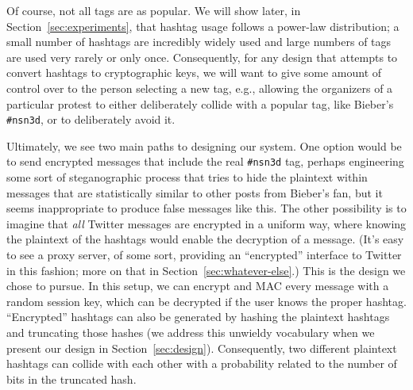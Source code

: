 Of course, not all tags are as popular. We will show later, in Section~\ref{sec:experiments}, that hashtag usage follows a power-law distribution; a small number of hashtags are incredibly widely used and large numbers of tags are used very rarely or only once. Consequently, for any design that attempts to convert hashtags to cryptographic keys, we will want to give some amount of control over to the person selecting a new tag, e.g., allowing the organizers of a particular protest to either deliberately collide with a popular tag, like Bieber's {\tt \#nsn3d}, or to deliberately avoid it.

Ultimately, we see two main paths to designing our system. One option would be to send encrypted messages that include the real {\tt \#nsn3d} tag, perhaps engineering some sort of steganographic process that tries to hide the plaintext within messages that are statistically similar to other posts from Bieber's fan, but it seems inappropriate to produce false messages like this. The other possibility is to imagine that {\em all} Twitter messages are encrypted in a uniform way, where knowing the plaintext of the hashtags would enable the decryption of a message. (It's easy to see a proxy server, of some sort, providing an ``encrypted'' interface to Twitter in this fashion; more on that in Section~\ref{sec:whatever-else}.) This is the design we chose to pursue. In this setup, we can encrypt and MAC every message with a random session key, which can be decrypted if the user knows the proper hashtag. ``Encrypted'' hashtags can also be generated by hashing the plaintext hashtags and truncating those hashes (we address this unwieldy vocabulary when we present our design in Section~\ref{sec:design}). Consequently, two different plaintext hashtags can collide with each other with a probability related to the number of bits in the truncated hash.

